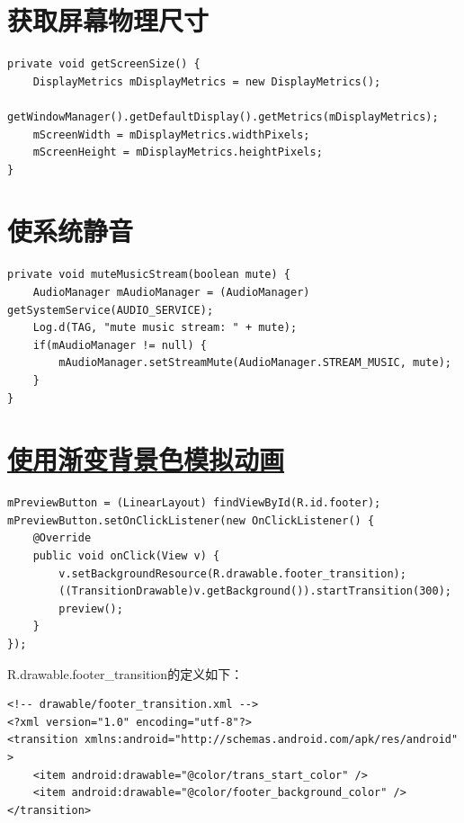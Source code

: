 ﻿\documentclass[a4paper,11pt]{article}
\begin{document}
  \section[获取屏幕物理尺寸]{获取屏幕物理尺寸}
  \begin{verbatim}
private void getScreenSize() {
    DisplayMetrics mDisplayMetrics = new DisplayMetrics();
    getWindowManager().getDefaultDisplay().getMetrics(mDisplayMetrics);
    mScreenWidth = mDisplayMetrics.widthPixels;
    mScreenHeight = mDisplayMetrics.heightPixels;
}
  \end{verbatim}

  \section[使系统静音]{使系统静音}
  \begin{verbatim}
private void muteMusicStream(boolean mute) {
    AudioManager mAudioManager = (AudioManager) getSystemService(AUDIO_SERVICE);
    Log.d(TAG, "mute music stream: " + mute);
    if(mAudioManager != null) {
        mAudioManager.setStreamMute(AudioManager.STREAM_MUSIC, mute);
    }
}
  \end{verbatim}

  \section[使用渐变背景色模拟动画]{\underline{使用渐变背景色模拟动画}}
  \begin{verbatim}
mPreviewButton = (LinearLayout) findViewById(R.id.footer);
mPreviewButton.setOnClickListener(new OnClickListener() {
    @Override
    public void onClick(View v) {
        v.setBackgroundResource(R.drawable.footer_transition);
        ((TransitionDrawable)v.getBackground()).startTransition(300);
        preview();
    }
});
  \end{verbatim}

  R.drawable.footer\_transition的定义如下：

  \begin{verbatim}
<!-- drawable/footer_transition.xml -->
<?xml version="1.0" encoding="utf-8"?>
<transition xmlns:android="http://schemas.android.com/apk/res/android" >
    <item android:drawable="@color/trans_start_color" />
    <item android:drawable="@color/footer_background_color" />
</transition>
  \end{verbatim}
\end{document}
